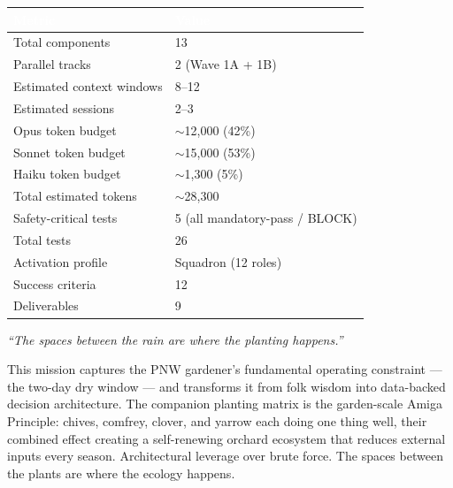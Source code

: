 \documentclass[11pt,letterpaper]{article}
\newcommand{\tableheader}[1]{\textbf{\sffamily\textcolor{white}{#1}}}
\begin{document}
\begin{center}
\begin{tabularx}{\textwidth}{L{5cm}X}
\toprule
{}
\tableheader{Metric} & \tableheader{Value} \\
\midrule
Total components & 13 \\
Parallel tracks & 2 (Wave 1A + 1B) \\
Estimated context windows & 8--12 \\
Estimated sessions & 2--3 \\
Opus token budget & $\sim$12,000 (42\%) \\
Sonnet token budget & $\sim$15,000 (53\%) \\
Haiku token budget & $\sim$1,300 (5\%) \\
Total estimated tokens & $\sim$28,300 \\
Safety-critical tests & 5 (all mandatory-pass / BLOCK) \\
Total tests & 26 \\
Activation profile & Squadron (12 roles) \\
Success criteria & 12 \\
Deliverables & 9 \\
\bottomrule
\end{tabularx}
\end{center}

\vspace{1cm}

\begin{quotebox}
\textit{``The spaces between the rain are where the planting happens.''}

\vspace{0.5em}

This mission captures the PNW gardener's fundamental operating constraint --- the two-day dry window --- and transforms it from folk wisdom into data-backed decision architecture. The companion planting matrix is the garden-scale Amiga Principle: chives, comfrey, clover, and yarrow each doing one thing well, their combined effect creating a self-renewing orchard ecosystem that reduces external inputs every season. Architectural leverage over brute force. The spaces between the plants are where the ecology happens.
\end{quotebox}
\end{document}
